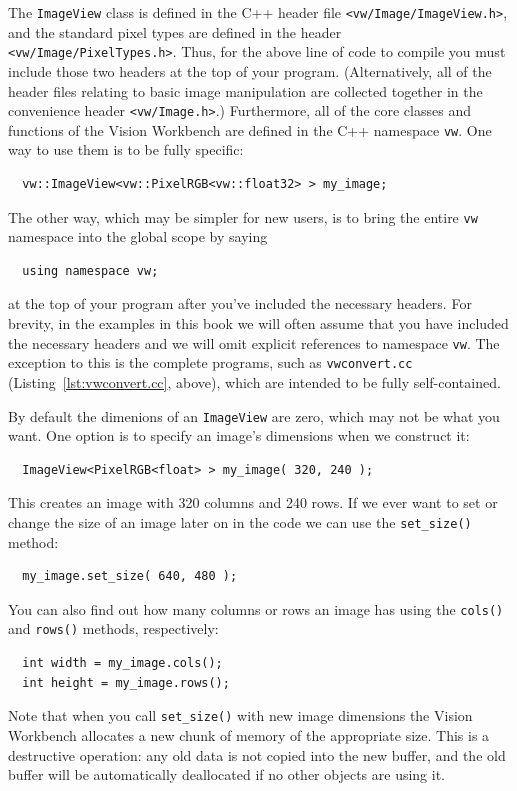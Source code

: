 The \verb#ImageView# class is defined in the C++ header file
\verb#<vw/Image/ImageView.h>#, and the standard pixel types are
defined in the header \verb#<vw/Image/PixelTypes.h>#.  Thus, for the
above line of code to compile you must include those two headers at
the top of your program.  (Alternatively, all of the header files
relating to basic image manipulation are collected together in the
convenience header \verb#<vw/Image.h>#.)  Furthermore, all of the core
classes and functions of the Vision Workbench are defined in the C++
namespace \verb#vw#.  One way to use them is to be fully specific:
\begin{verbatim}
  vw::ImageView<vw::PixelRGB<vw::float32> > my_image;
\end{verbatim}
The other way, which may be simpler for new users, is to bring the 
entire \verb#vw# namespace into the global scope by saying 
\begin{verbatim}
  using namespace vw;
\end{verbatim}
at the top of your program after you've included the necessary
headers.  For brevity, in the examples in this book we will often
assume that you have included the necessary headers and we will omit
explicit references to namespace \verb#vw#.  The exception to this is
the complete programs, such as \verb#vwconvert.cc#
(Listing~\ref{lst:vwconvert.cc}, above), which are intended to be
fully self-contained.

By default the dimenions of an \verb#ImageView# are zero, which may not 
be what you want.  One option is to specify an image's dimensions when 
we construct it:
\begin{verbatim}
  ImageView<PixelRGB<float> > my_image( 320, 240 );
\end{verbatim}
This creates an image with 320 columns and 240 rows.  If we ever want to 
set or change the size of an image later on in the code we can use the 
\verb#set_size()# method:
\begin{verbatim}
  my_image.set_size( 640, 480 );
\end{verbatim}
You can also find out how many columns or rows an image has using the 
\verb#cols()# and \verb#rows()# methods, respectively:
\begin{verbatim}
  int width = my_image.cols();
  int height = my_image.rows();
\end{verbatim}
Note that when you call \verb#set_size()# with new image dimensions
the Vision Workbench allocates a new chunk of memory of the
appropriate size.  This is a destructive operation: any old data is
not copied into the new buffer, and the old buffer will be
automatically deallocated if no other objects are using it.

